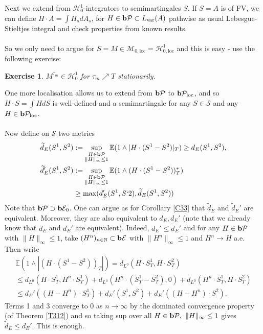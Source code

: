\documentclass[12pt,a4paper, twoside]{article}
\newtheorem{exe}{Exercise}[section]
\theoremstyle{definition}
\newcommand{\EE}{\mathbb{E}} %
\newcommand{\simple}{\textbf{\text{b}}\mathcal{E}}
\newcommand{\pred}{\textbf{\text{b}}\mathcal{P}}
\begin{document}
Next we extend from $\mathcal{H}_0^1$-integrators to semimartingales $S$. If $S=A$ is of FV, we can define $H \cdot A = \int H_s dA_s$, for $H \in \pred \subset L_{\text{var}}(A)$ pathwise as usual Lebesgue-Stieltjes integral and check properties from known results. \\
\\
So we only need to argue for $S= M \in \mathcal{M}_{0, \text{loc}} = \mathcal{H}_{0, \text{loc}}^1$ and this is easy - use the following exercise: 
\begin{exe} \label{ex11} $M^{\tau_m} \in \mathcal{H}_0^1$ for $\tau_m \nearrow T$ stationarily.
\end{exe}
One more localisation allows us to extend from $\pred$ to $\pred_\text{loc}$, and so $H \cdot S = \int H dS$ is well-defined and a semimartingale for any $S \in \mathcal{S}$ and any $H \in \pred_\text{loc}$.\\
\\
Now define on $\mathcal{S}$ two metrics 
\begin{align*}
\widetilde{d}_E(S^1,S^2)&:= \sup_{\substack{H \in \pred \\ \|H\|_\infty \leq 1}} \EE(1 \wedge |H \cdot (S^1-S^2)|_T) \geq d_E(S^1,S^2), \\
\widetilde{d}_E' (S^1,S^2)& := \sup_{ \substack{H \in \pred \\ \|H\|_\infty \leq1 }} \EE(1 \wedge (H \cdot (S^1-S^2))_T^*) \\
& \geq \max( d_E'(S^1,S`2), \widetilde{d}_E(S^1,S^2))
\end{align*}
Note that $\pred \supset \simple_0$. \newpage
One can argue as for Corollary \ref{C33} that $\widetilde{d}_E$ and $\widetilde{d}_E'$ are equivalent. Moreover, they are also equivalent to $d_E, d_E'$ (note that we already know that $d_E$ and $d_E'$ are equivalent). Indeed, $d_E' \leq \widetilde{d}_E'$ and for any $H \in \pred$ with $\|H\|_\infty \leq 1$, take $(H^n)_{n \in \mathbb{N}} \subset \simple$ with $\|H^n\|_\infty \leq 1$ and $H^n \to H$ a.e. Then write
\begin{align*}
\EE(1 \wedge | ( H \cdot (S^1-S^2))_T|) = d_{L^0} (H \cdot S_T^1, H \cdot S_T^2) \\
\leq d_{L^0} ( H \cdot S_T^1, H^n \cdot S_T^1) + d_{L^0} ( H^n \cdot (S_T^1-S_T^2) , 0) + d_{L^0} ( H^n \cdot S_T^1, H \cdot S_T^2) \\
 \leq d_E'((H-H^n) \cdot S_T^1) + d_E'( S^1, S^2) + d_E'( (H- H^n) \cdot S^2).
\end{align*}
Terms 1 and 3 converge to $0$ as $n \to \infty$ by the dominated convergence property (of Theorem \ref{T312}) and so taking sup over all $H \in \pred, \ \|H\|_\infty \leq 1$ gives $\widetilde{d}_E \leq d_E'$. This is enough. 
\end{document}
